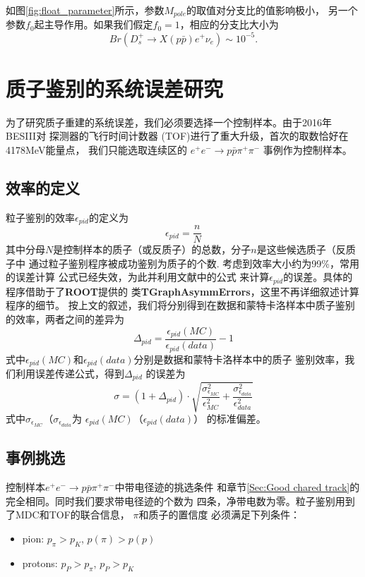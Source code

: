 如图\ref{fig:float_parameter}所示，参数$M_{pole}$的取值对分支比的值影响极小，
另一个参数$f_{0}$起主导作用。如果我们假定$f_{0}=1$，相应的分支比大小为
\begin{equation}
Br(D_{s}^{+} \rightarrow X(p\bar{p}) e^{+} \nu_{e}) \sim 10^{-5}.
\end{equation}
    
\section{质子鉴别的系统误差研究}
为了研究质子重建的系统误差，我们必须要选择一个控制样本。由于2016年BESIII对
探测器的飞行时间计数器 (TOF)进行了重大升级，首次的取数恰好在4178MeV能量点，
我们只能选取连续区的
$e^{+} e^{-} \rightarrow p \bar{p} \pi^{+} \pi^{-}$ 
事例作为控制样本。
\subsection{效率的定义}
粒子鉴别的效率$\epsilon_{pid}$的定义为
\begin{equation}
    \epsilon_{pid} = \frac{n}{N}
\end{equation}
其中分母$N$是控制样本的质子（或反质子）的总数，分子$n$是这些候选质子（反质子中
通过粒子鉴别程序被成功鉴别为质子的个数. 考虑到效率大小约为99\%，常用的误差计算
公式已经失效，为此并利用文献\cite{brown2001interval}中的公式
来计算$\epsilon_{pid}$的误差。具体的程序借助于了\textbf{ROOT}提供的
类\textbf{TGraphAsymmErrors}，这里不再详细叙述计算程序的细节。
按上文的叙述，我们将分别得到在数据和蒙特卡洛样本中质子鉴别的效率，两者之间的差异为
\begin{equation}
    \Delta _{pid} = \frac{\epsilon_{pid}(MC)}{\epsilon_{pid}(data)} - 1
\end{equation}
式中$\epsilon_{pid}(MC)$和$\epsilon_{pid}(data)$分别是数据和蒙特卡洛样本中的质子
鉴别效率，我们利用误差传递公式，得到$\Delta_{pid}$ 的误差为
\begin{equation}
    \sigma = (1+ \Delta_{pid})\cdot
    \sqrt{\frac{\sigma^{2}_{\epsilon_{MC}}}{\epsilon^{2}_{MC}} +
    \frac{\sigma^{2}_{\epsilon_{data}}}{\epsilon^{2}_{data}}}
\end{equation}
式中$\sigma_{\epsilon_{MC}}$（$\sigma_{\epsilon_{data}}$为
$\epsilon_{pid}(MC)$（$\epsilon_{pid}(data)$）
的标准偏差。

\subsection{事例挑选}
控制样本$e^{+} e^{-} \to p \bar{p} \pi^{+} \pi^{-}$中带电径迹的挑选条件
和章节\ref{Sec:Good chared track}的完全相同。同时我们要求带电径迹的个数为
四条，净带电数为零。粒子鉴别用到了MDC和TOF的联合信息， $\pi$和质子的置信度
必须满足下列条件：
\begin{itemize}
    \item pion:  $p_{\pi}>p_{K}$, $p(\pi) > p(p)$
    \item protons: $p_{P}>p_{\pi}$, $p_{P}>p_{K}$
\end{itemize}

